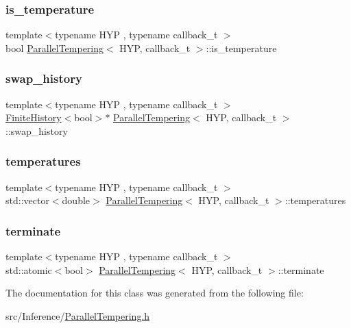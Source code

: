 \subsubsection{\texorpdfstring{is\+\_\+temperature}{is\_temperature}}
{\footnotesize\ttfamily template$<$typename H\+YP , typename callback\+\_\+t $>$ \\
bool \hyperlink{class_parallel_tempering}{Parallel\+Tempering}$<$ H\+YP, callback\+\_\+t $>$\+::is\+\_\+temperature}

\mbox{\label{class_parallel_tempering_af9ae9446ae4d22c0a26755f3d3a1d86a}} 
\subsubsection{\texorpdfstring{swap\+\_\+history}{swap\_history}}
{\footnotesize\ttfamily template$<$typename H\+YP , typename callback\+\_\+t $>$ \\
\hyperlink{class_finite_history}{Finite\+History}$<$bool$>$$\ast$ \hyperlink{class_parallel_tempering}{Parallel\+Tempering}$<$ H\+YP, callback\+\_\+t $>$\+::swap\+\_\+history}

\mbox{\label{class_parallel_tempering_a5aca1e6ca522986f183d61c91c94d21d}} 
\subsubsection{\texorpdfstring{temperatures}{temperatures}}
{\footnotesize\ttfamily template$<$typename H\+YP , typename callback\+\_\+t $>$ \\
std\+::vector$<$double$>$ \hyperlink{class_parallel_tempering}{Parallel\+Tempering}$<$ H\+YP, callback\+\_\+t $>$\+::temperatures}

\mbox{\label{class_parallel_tempering_acda523b375468743e7d8ac471af65285}} 
\subsubsection{\texorpdfstring{terminate}{terminate}}
{\footnotesize\ttfamily template$<$typename H\+YP , typename callback\+\_\+t $>$ \\
std\+::atomic$<$bool$>$ \hyperlink{class_parallel_tempering}{Parallel\+Tempering}$<$ H\+YP, callback\+\_\+t $>$\+::terminate}



The documentation for this class was generated from the following file\+:\begin{DoxyCompactItemize}
\item 
src/\+Inference/\hyperlink{_parallel_tempering_8h}{Parallel\+Tempering.\+h}\end{DoxyCompactItemize}
